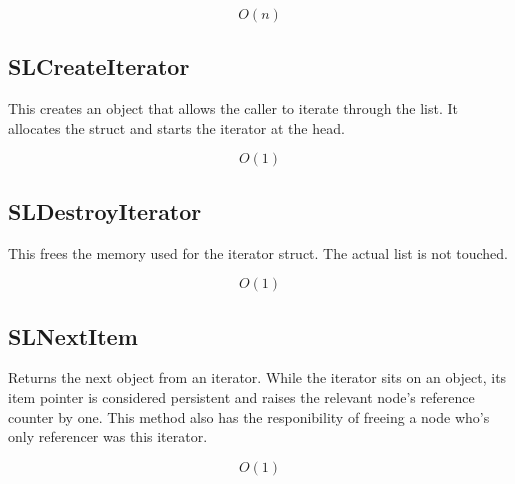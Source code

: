 \documentclass{article}
\begin{document}
$$O(n)$$

\subsection*{SLCreateIterator}

This creates an object that allows the caller to iterate through the list.
It allocates the struct and starts the iterator at the head.

$$O(1)$$

\subsection*{SLDestroyIterator}

This frees the memory used for the iterator struct. The actual list is not touched.

$$O(1)$$

\subsection*{SLNextItem}

Returns the next object from an iterator. While the iterator sits on an object, its item pointer is considered persistent and raises the relevant node's reference counter by one. This method also has the responibility of freeing a node who's only referencer was this iterator.

$$O(1)$$
\end{document}
